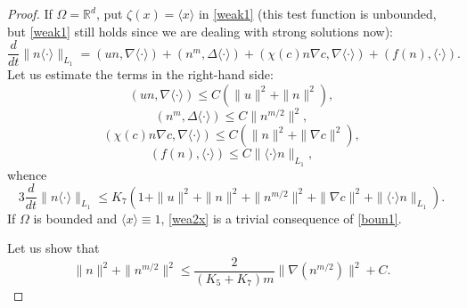 \documentclass[10pt]{amsart}
\begin{document}
\begin{proof}
If $\Omega={\mathbb{R}}^d$, put $\zeta(x)={\langle x \rangle}$ in \eqref{weak1} (this test function is unbounded, but \eqref{weak1} still holds since we are dealing with strong solutions now): 
\begin{equation}\label{wea1x}
\frac {d}{dt} \|n\langle\cdot\rangle\|_{L_1}=  (u n,\nabla \langle\cdot\rangle) +(n^m,\Delta\langle\cdot\rangle)+(\chi (c) n \nabla c,\nabla \langle\cdot\rangle)+(f(n),\langle\cdot\rangle).
\end{equation}
Let us estimate the terms in the right-hand side:
\begin{equation}\label{wea1x1}
 (u n,\nabla \langle\cdot\rangle)\leq C(\|u\|^2+\|n\|^2),\end{equation}
 \begin{equation}\label{wea1x2}
 (n^m,\Delta\langle\cdot\rangle)\leq C\|n^{m/2}\|^2,\end{equation}
  \begin{equation}\label{wea1x3}
 (\chi (c) n \nabla c,\nabla \langle\cdot\rangle)\leq C(\|n\|^2+\|\nabla c\|^2),\end{equation}
 \begin{equation}\label{wea1x4}
 (f(n),\langle\cdot\rangle)\leq C\| \langle\cdot\rangle n\|_{L_{1}},\end{equation}
 whence
 \begin{equation}\label{wea2x}
3\frac {d}{dt} \|n\langle\cdot\rangle\|_{L_1}\leq K_7(1+\|u\|^2+\|n\|^2+\|n^{m/2}\|^2+\|\nabla c\|^2+\| \langle\cdot\rangle n\|_{L_{1}}).
\end{equation}
If $\Omega$ is bounded and ${\langle x \rangle}\equiv 1$, \eqref{wea2x} is a trivial consequence of \eqref{boun1}.  

Let us show that 
\begin{equation}\label{n4}
\|n\|^2+\|n^{m/2}\|^2\leq \frac 2 {(K_5 +K_7)m} \|\nabla(n^{m/2})\|^2 + C.
\end{equation}


\end{proof}
\end{document}
